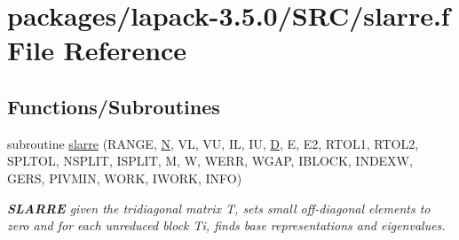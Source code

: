 \hypertarget{slarre_8f}{}\section{packages/lapack-\/3.5.0/\+S\+R\+C/slarre.f File Reference}
\label{slarre_8f}
\subsection*{Functions/\+Subroutines}
\begin{DoxyCompactItemize}
\item 
subroutine \hyperlink{group__auxOTHERauxiliary_ga4a2b9dcf8e9c8f368fb6d39506781f46}{slarre} (R\+A\+N\+G\+E, \hyperlink{polmisc_8c_a0240ac851181b84ac374872dc5434ee4}{N}, V\+L, V\+U, I\+L, I\+U, \hyperlink{odrpack_8h_a7dae6ea403d00f3687f24a874e67d139}{D}, E, E2, R\+T\+O\+L1, R\+T\+O\+L2, S\+P\+L\+T\+O\+L, N\+S\+P\+L\+I\+T, I\+S\+P\+L\+I\+T, M, W, W\+E\+R\+R, W\+G\+A\+P, I\+B\+L\+O\+C\+K, I\+N\+D\+E\+X\+W, G\+E\+R\+S, P\+I\+V\+M\+I\+N, W\+O\+R\+K, I\+W\+O\+R\+K, I\+N\+F\+O)
\begin{DoxyCompactList}\small\item\em {\bfseries S\+L\+A\+R\+R\+E} given the tridiagonal matrix T, sets small off-\/diagonal elements to zero and for each unreduced block Ti, finds base representations and eigenvalues. \end{DoxyCompactList}\end{DoxyCompactItemize}
